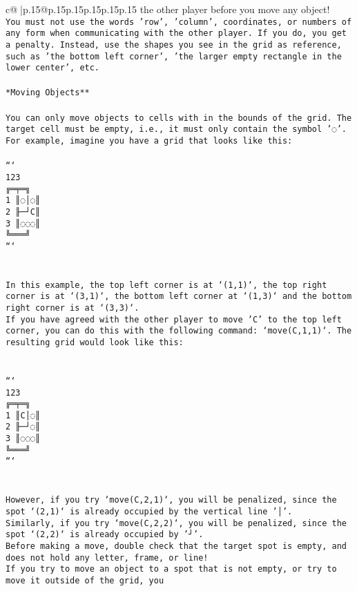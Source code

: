 \documentclass{article}
\begin{document}
{\begin{supertabular}{c@{$\;$}|p{.15\linewidth}@{}p{.15\linewidth}p{.15\linewidth}p{.15\linewidth}p{.15\linewidth}p{.15\linewidth}}
{{{the other player before you move any object!\\ \tt * You must not use the words 'row', 'column', coordinates, or numbers of any form when communicating with the other player. If you do, you get a penalty. Instead, use the shapes you see in the grid as reference, such as 'the bottom left corner', 'the larger empty rectangle in the lower center', etc.\\ \tt \\ \tt **Moving Objects**\\ \tt \\ \tt * You can only move objects to cells with in the bounds of the grid. The target cell must be empty, i.e., it must only contain the symbol '◌'.\\ \tt * For example, imagine you have a grid that looks like this: \\ \tt \\ \tt ```\\ \tt     123\\ \tt    ╔═╤═╗\\ \tt  1 ║◌│◌║\\ \tt  2 ╟─┘C║\\ \tt  3 ║◌◌◌║\\ \tt    ╚═══╝\\ \tt ```\\ \tt \\ \tt \\ \tt * In this example, the top left corner is at `(1,1)`, the top right corner is at `(3,1)`, the bottom left corner at `(1,3)` and the bottom right corner is at `(3,3)`.\\ \tt * If you have agreed with the other player to move 'C' to the top left corner, you can do this with the following command: `move(C,1,1)`. The resulting grid would look like this: \\ \tt \\ \tt \\ \tt ```\\ \tt     123\\ \tt    ╔═╤═╗\\ \tt  1 ║C│◌║\\ \tt  2 ╟─┘◌║\\ \tt  3 ║◌◌◌║\\ \tt    ╚═══╝\\ \tt ```\\ \tt \\ \tt \\ \tt * However, if you try `move(C,2,1)`, you will be penalized, since the spot `(2,1)` is already occupied by the vertical line '│'.\\ \tt * Similarly, if you try `move(C,2,2)`, you will be penalized, since the spot `(2,2)` is already occupied by '┘'.\\ \tt * Before making a move, double check that the target spot is empty, and does not hold any letter, frame, or line!\\ \tt * If you try to move an object to a spot that is not empty, or try to move it outside of the grid, you }}}
\end{supertabular}}
\end{document}
